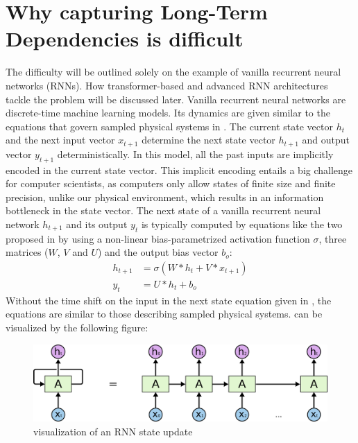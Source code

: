 \documentclass[draft,final]{vutinfth} %
\begin{document}
    \section{Why capturing Long-Term Dependencies is difficult} \label{long_term_difficult}
    The difficulty will be outlined solely on the example of vanilla recurrent neural networks (RNNs).
    How transformer-based and advanced RNN architectures tackle the problem will be discussed later.
    Vanilla recurrent neural networks are discrete-time machine learning models.
    Its dynamics are given similar to the equations that govern sampled physical systems in .
    The current state vector $h_{t}$ and the next input vector $x_{t+1}$ determine the next state vector $h_{t+1}$ and output vector $y_{t+1}$ deterministically.
    In this model, all the past inputs are implicitly encoded in the current state vector.
    This implicit encoding entails a big challenge for computer scientists, as computers only allow states of finite size and finite precision, unlike our physical environment, which results in an information bottleneck in the state vector.
    The next state of a vanilla recurrent neural network $h_{t+1}$ and its output $y_{t}$ is typically computed by equations like the two proposed in \cite[p. 2]{UnitaryRNNs} by using a non-linear bias-parametrized activation function $\sigma$, three matrices ($W$, $V$ and $U$) and the output bias vector $b_o$:
    \begin{align}
        \label{rnn_state_update}
        h_{t+1} &= \sigma(W*h_t + V*x_{t+1}) \\
        \label{rnn_output}
        y_{t} &= U*h_{t} + b_o
    \end{align}
    Without the time shift on the input in the next state equation given in , the equations are similar to those describing sampled physical systems.
     can be visualized by the following figure:
    \begin{figure}[H]
        \centering{}
        \includegraphics[width=0.8\linewidth]{graphics/rnn.png}
        \caption{visualization of an RNN state update \cite{rnn_vis}}
        \label{fig:rnn_vis}
    \end{figure}
\end{document}
